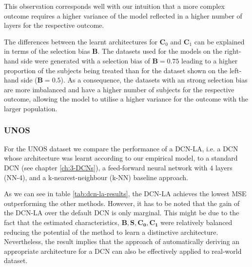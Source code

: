 This observation corresponds well with our intuition that a more complex outcome requires a higher variance of the model reflected in a higher number of layers for the respective outcome. 


The differences between the learnt architectures for $\mathbf{C}_0$ and $\mathbf{C}_1$ can be explained in terms of the selection bias $\mathbf{B}$. The datasets used for the models on the right-hand side were generated with a selection bias of $\mathbf{B} = 0.75$ leading to a higher proportion of the subjects being treated than for the dataset shown on the left-hand side ($\mathbf{B} = 0.5$). As a consequence, the datasets with an strong selection bias are more imbalanced and have a higher number of subjects for the respective outcome, allowing the model to utilise a higher variance for the outcome with the larger population. 


\subsubsection{UNOS}
For the UNOS dataset we compare the performance of a DCN-LA, i.e. a DCN whose architecture was learnt according to our empirical model, to a standard DCN (see chapter \ref{ch:3-DCNs}), a feed-forward neural network with $4$ layers (NN-4), and a k-nearest-neighbour (k-NN) baseline approach.  

As we can see in table \ref{tab:dcn-la-results}, the DCN-LA achieves the lowest MSE outperforming the other methods. However, it has to be noted that the gain of the DCN-LA over the default DCN is only marginal. This might be due to the fact that the estimated characteristics, $\mathbf{B}, \mathbf{S}, \mathbf{C_0}, \mathbf{C_1}$ %
were relatively balanced reducing the potential of the method to learn a distinctive architecture. Nevertheless, the result implies that the approach of automatically deriving an appropriate architecture for a DCN can also be effectively applied to real-world dataset. 
%

